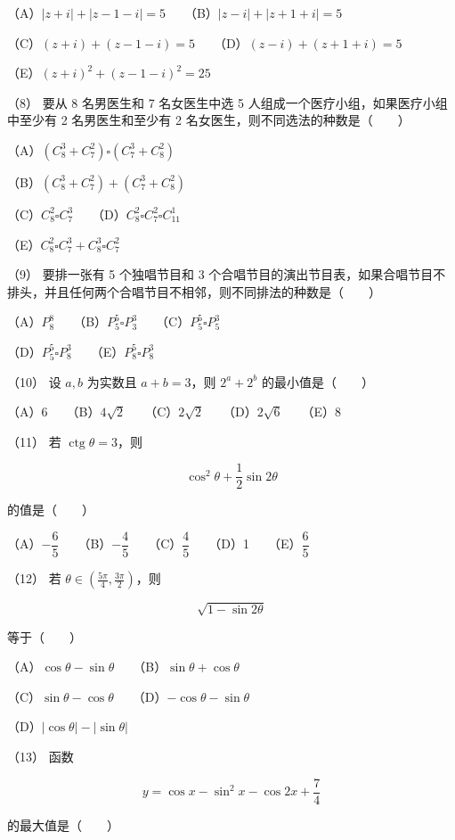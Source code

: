 \begin{question}
（A）$|z+i|+|z-1-i|=5$　　（B）$|z-i|+|z+1+i|=5$

（C）$(z+i)+(z-1-i)=5$　　（D）$(z-i)+(z+1+i)=5$

（E）$(z+i)^2+(z-1-i)^2=25$

（8） 要从 8 名男医生和 7 名女医生中选 5 人组成一个医疗小组，如果医疗小组中至少有 2 名男医生和至少有 2 名女医生，则不同选法的种数是\mbox{（　　）}

（A）$(C_8^3+C_7^2)\square(C_7^3+C_8^2)$

（B）$(C_8^3+C_7^2)+(C_7^3+C_8^2)$

（C）$C_8^2\square C_7^3$　　（D）$C_8^2\square C_7^2\square C_{11}^1$

（E）$C_8^2\square C_7^3+C_8^3\square C_7^2$


（9） 要排一张有 5 个独唱节目和 3 个合唱节目的演出节目表，如果合唱节目不排头，并且任何两个合唱节目不相邻，则不同排法的种数是\mbox{（　　）}

（A）$P_8^8$　　（B）$P_5^5\square P_3^3$　　（C）$P_5^5\square P_5^3$

（D）$P_5^5\square P_8^3$　　（E）$P_8^5\square P_8^3$

（10） 设 $a,b$ 为实数且 $a+b=3$，则 $2^a+2^b$ 的最小值是\mbox{（　　）}

（A）6　　（B）$4\sqrt2$　　（C）$2\sqrt2$　　（D）$2\sqrt6$　　（E）8

（11） 若 $\operatorname{ctg}\theta=3$，则

\nopagebreak[4]
\[
\cos^2\theta+\frac12\sin2\theta
\]

的值是\mbox{（　　）}

（A）$-\dfrac65$　　（B）$-\dfrac45$　　（C）$\dfrac45$　　（D）1　　（E）$\dfrac65$

（12） 若 $\theta\in(\frac{5\pi}4,\frac{3\pi}2)$，则

\nopagebreak[4]
\[
\sqrt{1-\sin2\theta}
\]

等于\mbox{（　　）}

（A）$\cos\theta-\sin\theta$　　（B）$\sin\theta+\cos\theta$

（C）$\sin\theta-\cos\theta$　　（D）$-\cos\theta-\sin\theta$

（D）$|\cos\theta|-|\sin\theta|$

（13） 函数

\nopagebreak[4]
\[
y=\cos x-\sin^2x-\cos2x+\frac74
\]

的最大值是\mbox{（　　）}


\end{question}
